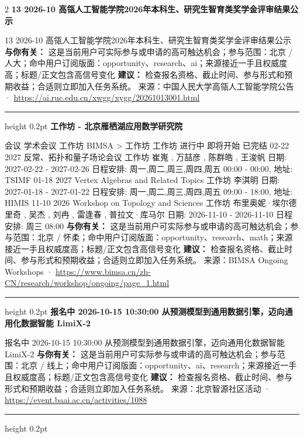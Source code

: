 \documentclass[10.5pt]{ctexart}
\begin{document}
\begin{multicols}{2}
{\large\bfseries 13 2026-10 高瓴人工智能学院2026年本科生、研究生智育类奖学金评审结果公示}\par
13 2026-10 高瓴人工智能学院2026年本科生、研究生智育类奖学金评审结果公示
\textbf{与你有关：} 这是当前用户可实际参与或申请的高可触达机会；参与范围：北京 / 人大；命中用户订阅版面：opportunity、research、ai；来源接近一手且权威度高；标题/正文包含高信号变化
\textbf{建议：} 检查报名资格、截止时间、参与形式和预期收益；合适则立即加入任务系统。
{\footnotesize\color{ormuted} 来源：中国人民大学高瓴人工智能学院公告 · \url{https://ai.ruc.edu.cn/xwgg/xygg/20261013001.html}}
\vspace{2mm}
\hrule height 0.2pt
\vspace{2mm}
{\large\bfseries 工作坊 - 北京雁栖湖应用数学研究院}\par
会议 学术会议 工作坊 BIMSA > 工作坊 工作坊 进行中 即将开始 已完结 02-22 2027 反常、拓扑和量子场论会议 工作坊 崔嵬 , 万喆彦 , 陈群皓 , 王浚帆 日期: 2027-02-22 - 2027-02-26 日程安排: 周一,周二,周三,周四,周五 00:00 - 00:00, 地址: TSIMF 01-18 2027 Vertex Algebras and Related Topics 工作坊 李淇明 日期: 2027-01-18 - 2027-01-22 日程安排: 周一,周二,周三,周四,周五 09:00 - 18:00, 地址: HIMIS 11-10 2026 Workshop on Topology and Sciences 工作坊 布里奥妮·埃尔德里奇 , 吴杰 , 刘冉 , 雷逢春 , 普拉文·库马尔 日期: 2026-11-10 - 2026-11-10 日程安排: 周三 08:00
\textbf{与你有关：} 这是当前用户可实际参与或申请的高可触达机会；参与范围：北京 / 怀柔；命中用户订阅版面：opportunity、research、math；来源接近一手且权威度高；标题/正文包含高信号变化
\textbf{建议：} 检查报名资格、截止时间、参与形式和预期收益；合适则立即加入任务系统。
{\footnotesize\color{ormuted} 来源：BIMSA Ongoing Workshops · \url{https://www.bimsa.cn/zh-CN/research/workshop/ongoing/page_1.html}}
\vspace{2mm}
\hrule height 0.2pt
\vspace{2mm}
{\large\bfseries 报名中 2026-10-15 10:30:00 从预测模型到通用数据引擎，迈向通用化数据智能 LimiX-2}\par
报名中 2026-10-15 10:30:00 从预测模型到通用数据引擎，迈向通用化数据智能 LimiX-2
\textbf{与你有关：} 这是当前用户可实际参与或申请的高可触达机会；参与范围：北京 / 线上；命中用户订阅版面：opportunity、ai、research；来源接近一手且权威度高；标题/正文包含高信号变化
\textbf{建议：} 检查报名资格、截止时间、参与形式和预期收益；合适则立即加入任务系统。
{\footnotesize\color{ormuted} 来源：北京智源社区活动 · \url{https://event.baai.ac.cn/activities/1088}}
\vspace{2mm}
\hrule height 0.2pt

\end{multicols}
\end{document}
